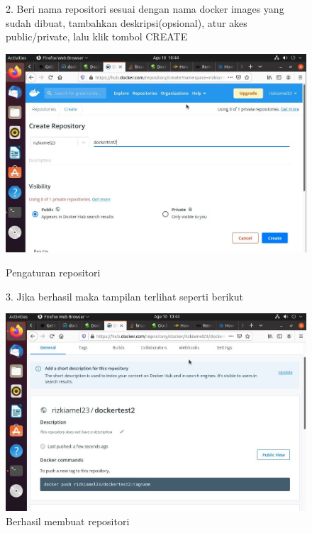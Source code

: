 \begin{figure}
    2. Beri nama repositori sesuai dengan nama docker images yang sudah dibuat, tambahkan deskripsi(opsional), atur akes public/private, lalu klik tombol CREATE
        \begin{center}
            \includegraphics[width=\linewidth]{image/27.jpg}
            \caption{Pengaturan repositori}
            \label{fig:my_figure}
        \end{center}

    3. Jika berhasil maka tampilan terlihat seperti berikut 
        \begin{center}
            \includegraphics[width=\linewidth]{image/28.jpg}
            \caption{Berhasil membuat repositori}
            \label{fig:my_figure}
        \end{center}
\end{figure}
